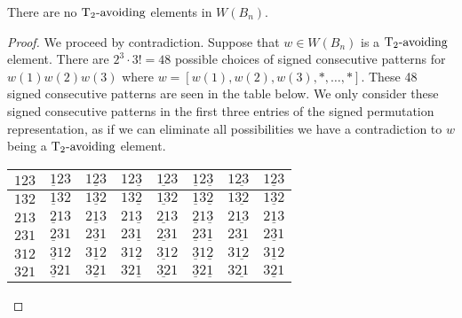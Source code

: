 \begin{theorem}\label{thm:classificationofB}
There are no $\operatorname{T_2-\mathrm{avoiding}}$ elements in $W(B_n)$.	


\begin{proof}
We proceed by contradiction. Suppose that $w \in W(B_n)$ is a $\operatorname{T_2-\mathrm{avoiding}}$ element. There are $2^3 \cdot 3!=48$ possible choices of signed consecutive patterns for $w(1)w(2)w(3)$ where $w=[w(1), w(2), w(3), \ast, \ldots, \ast]$. These 48 signed consecutive patterns are seen in the table below. We only consider these signed consecutive patterns in the first three entries of the signed permutation representation, as if we can eliminate all possibilities we have a contradiction to $w$ being a $\operatorname{T_2-\mathrm{avoiding}}$ element.

\begin{center}
\begin{tabular}{|l|l|l|l|l|l|l|l|}
\hline
\cellcolor{blue!30}$123$ & \cellcolor{orange2!40}$\underline{1}23$ & \cellcolor{brown!50}$1\underline{2}3$ & \cellcolor{red!25}$12\underline{3}$ & \cellcolor{brown!50}$\underline{12}3$ & \cellcolor{red!25}$\underline{1}2\underline{3}$ & \cellcolor{turq!40}$1\underline{23}$ & \cellcolor{turq!40}$\underline{123}$ \\
\hline
\cellcolor{blue!30}$132$ & \cellcolor{orange2!40}$\underline{1}32$ & \cellcolor{brown!50}$1\underline{3}2$ & \cellcolor{red!25}$13\underline{2}$ & \cellcolor{brown!50}$\underline{13}2$ & \cellcolor{red!25}$\underline{1}3\underline{2}$ & \cellcolor{ggreen!50}$1\underline{32}$ & \cellcolor{ggreen!50}$\underline{132}$ \\
\hline
\cellcolor{blue!30}$213$ & \cellcolor{yellow!50}$\underline{2}13$ & \cellcolor{brown!50}$2\underline{1}3$ & \cellcolor{turq!40}$21\underline{3}$ & \cellcolor{yellow!50}$\underline{21}3$ & \cellcolor{red!25}$\underline{2}1\underline{3}$ & \cellcolor{turq!40}$2\underline{13}$ & \cellcolor{red!25}$\underline{213}$ \\
\hline
\cellcolor{red!25}$231$ & \cellcolor{purple2!50}$\underline{2}31$ & \cellcolor{ggreen!50}$2\underline{3}1$ & \cellcolor{red!25}$23\underline{1}$ & \cellcolor{brown!50}$\underline{23}1$ & \cellcolor{purple2!50}$\underline{2}3\underline{1}$ & \cellcolor{ggreen!50}$2\underline{31}$ & \cellcolor{brown!50}$\underline{231}$ \\
\hline
\cellcolor{ggreen!50}$312$ & \cellcolor{yellow!50}$\underline{3}12$ & \cellcolor{ggreen!50}$3\underline{1}2$ &\cellcolor{turq!40}$31\underline{2}$ & \cellcolor{yellow!50}$\underline{31}2$ & \cellcolor{yellow!50}$\underline{3}1\underline{2}$ & \cellcolor{turq!40}$3\underline{12}$ & \cellcolor{yellow!50}$\underline{312}$ \\
\hline
\cellcolor{turq!40}$321$ & \cellcolor{yellow!50}$\underline{3}21$ & \cellcolor{ggreen!50}$3\underline{2}1$ & \cellcolor{turq!40}$32\underline{1}$ & \cellcolor{yellow!50}$\underline{32}1$ & \cellcolor{yellow!50}$\underline{3}2\underline{1}$ & \cellcolor{ggreen!50}$3\underline{21}$ & \cellcolor{yellow!50}$\underline{321}$\\
\hline
\end{tabular}
\end{center}


\end{proof}
\end{theorem}
